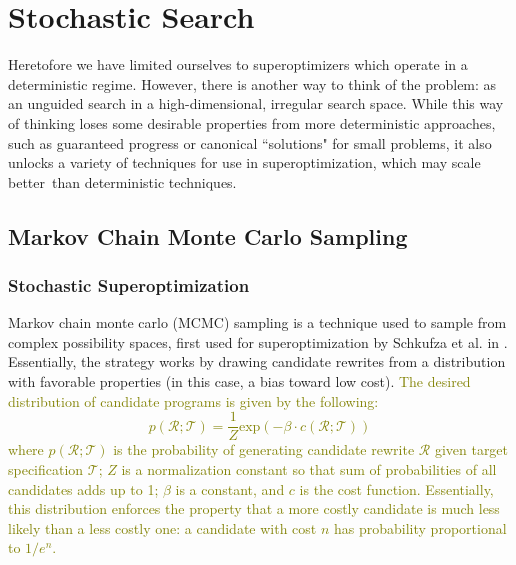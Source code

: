 \documentclass[12pt,twoside]{reedthesis}
\newcommand{\green}[1]{\textcolor{olive}{#1}}
\begin{document}
\chapter{Stochastic Search}
    Heretofore we have limited ourselves to superoptimizers which operate in a deterministic regime.
    However, there is another way to think of the problem: as an unguided search in a high-dimensional, irregular search space.
    While this way of thinking loses some desirable properties from more deterministic approaches, such as guaranteed progress or canonical ``solutions" for small problems, it also unlocks a variety of techniques for use in superoptimization, which may scale better\footnotemark\, than deterministic techniques.
    

    \section{Markov Chain Monte Carlo Sampling}
    \subsection{Stochastic Superoptimization}
        Markov chain monte carlo (MCMC) sampling is a technique used to sample from complex possibility spaces, first used for superoptimization by Schkufza et al. in \cite{schkufza2013stoke}.
        Essentially, the strategy works by drawing candidate rewrites from a distribution with favorable properties (in this case, a bias toward low cost). \green{The desired distribution of candidate programs is given by the following:
        \[
            p(\mathcal{R;T}) = \frac{1}{Z} \mathrm{exp}\left(-\beta \cdot c(\mathcal{R;T})\right)
        \]
        where $p(\mathcal{R;T})$ is the probability of generating candidate rewrite $\mathcal{R}$ given target specification $\mathcal{T}$; $Z$ is a normalization constant so that sum of probabilities of all candidates adds up to 1; $\beta$ is a constant, and $c$ is the cost function. 
        Essentially, this distribution enforces the property that a more costly candidate is much less likely than a less costly one: a candidate with cost $n$ has probability proportional to $1/e^n$.
        }
\end{document}
